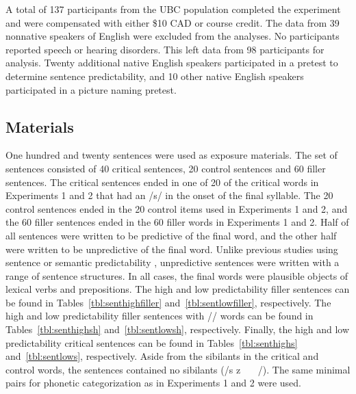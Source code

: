 A total of 137 participants from the UBC population completed the experiment and were compensated with either \$10 CAD or course credit.  
The data from 39 nonnative speakers of English were excluded from the analyses.
No participants reported speech or hearing disorders.
This left data from 98 participants for analysis.
Twenty additional native English speakers participated in a pretest to determine sentence predictability, and 10 other native English speakers participated in a picture naming pretest.

\subsection{Materials}

One hundred and twenty sentences were used as exposure materials.  
The set of sentences consisted of 40 critical sentences, 20 control sentences and 60 filler sentences. 
The critical sentences ended in one of 20 of the critical words in Experiments 1 and 2 that had an /s/ in the onset of the final syllable.  
The 20 control sentences ended in the 20 control items used in Experiments 1 and 2, and the 60 filler sentences ended in the 60 filler words in Experiments 1 and 2.  
Half of all sentences were written to be predictive of the final word, and the other half were written to be unpredictive of the final word.  
Unlike previous studies using sentence or semantic predictability \citep{Kalikow1977}, unpredictive sentences were written with a range of sentence structures.
In all cases, the final words were plausible objects of lexical verbs and prepositions.
The high and low predictability filler sentences can be found in Tables~\ref{tbl:senthighfiller} and~\ref{tbl:sentlowfiller}, respectively.
The high and low predictability filler sentences with /\textesh/ words can be found in Tables~\ref{tbl:senthighsh} and~\ref{tbl:sentlowsh}, respectively.
Finally, the high and low predictability critical sentences can be found in Tables~\ref{tbl:senthighs} and~\ref{tbl:sentlows}, respectively.
Aside from the sibilants in the critical and control words, the sentences contained no sibilants (/s z \textesh\ \textyogh\ \textteshlig\  \textdyoghlig/).  
The same minimal pairs for phonetic categorization as in Experiments 1 and 2 were used.

